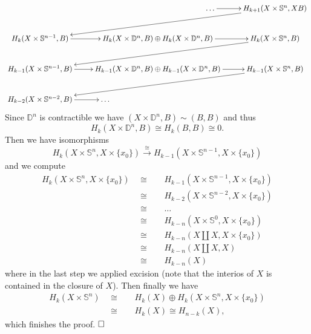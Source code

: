 \documentclass[11pt]{book}
\numberwithin{dummy}{section}
\theoremstyle{nonumberbreak}
\newenvironment{sol}[1][]{\ifthenelse{\equal{#1}{}}{\solution}{\solution[#1]}\rm}{\endsolution}
\newenvironment{prob}[1][]{\ifthenelse{\equal{#1}{}}{\problem}{\problem[#1]}\rm}{\endproblem}
\newcommand{\Sph}{\mathbb{S}}
\newcommand{\la}{\longrightarrow}
\begin{document}
\begin{spacing}{1.4}
\begin{prob}
\begin{sol}
$$\begin{xy}
\xymatrix{
&\qquad \qquad \qquad \qquad \qquad \qquad \qquad \ldots \ar[r] & H_{k+1}(X \times \Sph^{n}, X B) \ar[lld] \\
H_k(X \times \Sph^{n-1}, B) \ar[r] &  H_k(X \times \mathbb{D}^n, B) \oplus H_k(X \times \mathbb{D}^n, B) \ar[r] & H_k(X \times \Sph^n, B) \ar[lld] \\
H_{k-1}(X \times \Sph^{n-1}, B) \ar[r] &  H_{k-1}(X \times \mathbb{D}^n, B) \oplus H_{k-1}(X \times \mathbb{D}^n, B) \ar[r] & H_{k-1}(X \times \Sph^n, B) \ar[lld] \\
H_{k-2}(X \times \Sph^{n-2}, B) \ar[r] & \ldots \qquad \qquad \qquad \qquad \qquad \qquad \qquad&
}
\end{xy}
$$
Since $\mathbb{D}^n$ is contractible we have $(X \times \mathbb{D}^n, B) \sim (B,B)$ and thus 
$$H_k(X \times \mathbb{D}^n,B) \cong H_k(B,B) \cong 0.$$
Then we have isomorphisms
$$H_k(X \times \Sph^n, X \times \{x_0\}) \overset{\cong}{\la}  H_{k-1}( X \times \Sph^{n-1}, X \times \{x_0\})$$
and we compute
\begin{alignat*}{5}
H_k(X \times \Sph^n, X \times \{x_0\}) \ \ &\cong&& \ \ H_{k-1}(X \times \Sph^{n-1}, X \times \{x_0\})\\
&\cong&& \ \ H_{k-2}(X \times \Sph^{n-2}, X \times \{x_0\}) \\
&\cong&& \ \ \ldots \\
& \cong && \ \ H_{k-n}(X \times \Sph^0, X \times \{x_0\})\\
&\cong && \ \ H_{k-n}(X \amalg X, X \times \{x_0\}) \\
& \cong && \ \ H_{k-n}(X \amalg X, X)\\
&\cong&& \ \ H_{k-n}(X)
\end{alignat*}
where in the last step we applied excision (note that the interios of $X$ is contained in the closure of $X$). Then finally we have 
\begin{alignat*}{5}
H_k(X \times \Sph^n) \ \ &\cong&& \ \ H_k(X) \oplus H_k(X \times \Sph^n, X \times \{x_0\}) \\
&\cong&& \ \ H_k(X) \cong H_{n-k}(X),
\end{alignat*}
which finishes the proof. $\hfill \Box$


\end{sol}
\end{prob}



\end{spacing}
\end{document}
